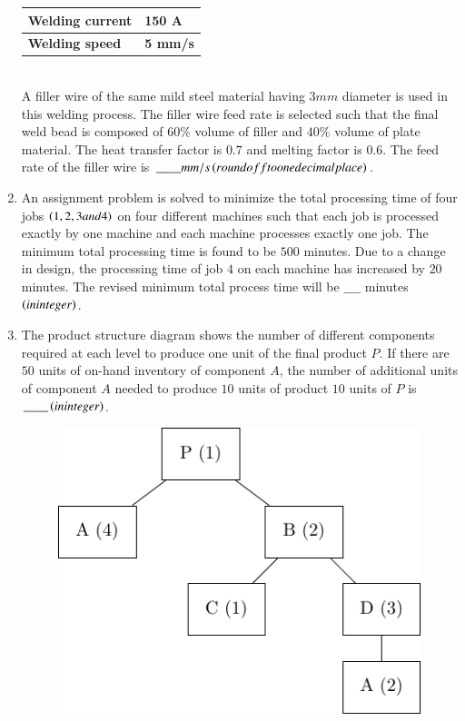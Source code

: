 \documentclass[journal]{IEEEtran}
\begin{document}
\begin{enumerate}
\begin{table}[h!]
\begin{tabular}{|m{5cm}|m{3cm}|}
    \hline
    \textbf{Welding current} & \textbf{150 A} \\ 
    \hline
    \textbf{Welding speed} & \textbf{5 mm/s} \\ 
    \hline
\end{tabular}
\end{table}\\
     A filler wire of the same mild steel material having $3 mm$ diameter is used in this welding process. The filler wire feed rate is selected such that the final weld bead is composed of $60\%$ volume of filler and $40\%$ volume of plate material. The heat transfer factor is $0.7$ and melting factor is $0.6$. The feed rate of the filler wire is $\_\_\_\_ mm/s \left(round off to one decimal place\right)$.\\
     \item An assignment problem is solved to minimize the total processing time of four jobs $\left(1,2,3 and 4\right)$ on four different machines such that each job is processed exactly by one machine and each machine processes exactly one job. The minimum total processing time is found to be $500$ minutes. Due to a change in design, the processing time of job $4$ on each machine has increased by $20$ minutes. The revised minimum total process time will be $\_\_\_\_$ minutes $\left(in integer\right)$.\\
     \item The product structure diagram shows the number of different components required 
     at each level to produce one unit of the final product $P$. If there are $50$ units of on-hand inventory of component $A$, the number of additional units of component $A$ needed to produce $10$ units of product $10$ units of $P$ is $\_\_\_\_ \left(in integer\right)$.\\
\begin{figure}[h!]
         \centering
        \includegraphics[width=0.7\linewidth]{figure/fig3/fig3.pdf}
		\caption{}
        \label{stemplot}


\end{figure}
\end{enumerate}
\end{document}
